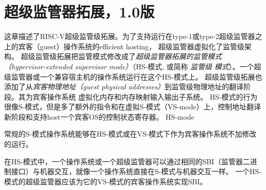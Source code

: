 \chapter{超级监管器拓展，1.0版}
\label{hypervisor}

这章描述了RISC-V超级监管级拓展。为了支持运行在type-1或type-2超级监管器之上的宾客（guest）操作系统的efficient hosting，
超级监管器虚拟化了监管级架构。
超级监管级拓展把监管模式修改成了{\em 超级监管器拓展的监管模式（hypervisor-extended supervisor mode）}（HS-模式, 或简称 {\em 监管级
模式}）。一个超级监管器或一个兼容宿主机的操作系统运行在这个HS-模式上。
超级监管级拓展也添加了从{\em 宾客物理地址（guest physical addresses）}到监管级物理地址的翻译阶段。其为宾客操作系统
虚拟化内存和内存映射输入输出子系统。
HS-模式的行为很像S-模式，但是多了额外的指令和在虚拟S-模式（VS-mode）上，控制地址翻译新阶段和支持host一个宾客OS的控制状态寄存器。
HS-mode

常规的S-模式操作系统能够在HS-模式或在VS-模式下作为宾客操作系统不加修改的运行。

在HS-模式中，一个操作系统或一个超级监管器可以通过相同的SBI（监管器二进制接口）与机器交互，就像一个操作系统直接在S-模式与机器交互一样。
一个HS-模式的超级监管器应该为它的VS-模式的宾客操作系统实现SBI。

